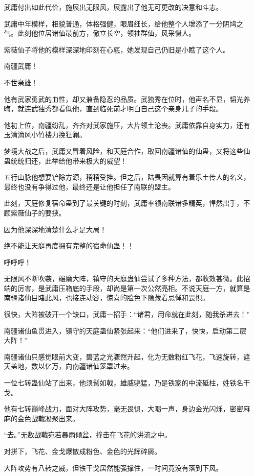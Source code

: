\begin{this_body}
武庸付出如此代价，施展出无限风，展露出了他无可更改的决意和斗志。

武庸中年模样，相貌普通，体格强健，眼眉细长，给他整个人增添了一分阴鸠之气。此刻他位居诸仙最前方，傲立长空，领袖群仙，风采慑人。

紫薇仙子将他的模样深深地印刻在心底，她发现自己仍旧是小瞧了这个人。

南疆武庸！

不世枭雄！

他有武家勇武的血性，却又兼备隐忍的品质。武独秀在位时，他声名不显，韬光养晦，就连武独秀都看低他，直到临死前才明白自己这个亲身儿子的手段。

他初上位，南疆纷乱，齐齐对武家施压，大片领土沦丧。武庸依靠自身实力，还有玉清滴风小竹楼力挽狂澜。

梦境大战之后，武庸又冒着风险，和天庭合作，取回南疆诸仙的仙蛊，又将这些仙蛊统统归还，此举给他带来极大的威望！

五行山脉他想要铲除方源，稍稍受挫。但之后，陆畏因就算有着乐土传人的名义，最终也没有争得过他，最终还是让他担任了南联的盟主。

此刻，天庭修复宿命蛊到了最关键的时刻，武庸率领南联诸多精英，悍然出手，不顾紫薇仙子的要挟。

因为他深深地清楚什么才是大局！

绝不能让天庭再度拥有完整的宿命仙蛊！！

呼呼呼！

无限风不断吹袭，碾磨大阵，镇守的天庭蛊仙尝试了多种方法，都收效甚微。此招端的厉害，是武庸压箱底的手段，却尚是第一次公然亮相。不说天庭一方，就算是南疆诸仙目睹此风，也接连动容，惊喜的脸色下隐藏着忌惮和畏惧。

很快，大阵被破开一个缺口，武庸一招手：“诸君，用命就在此刻，随我杀进去！”

南疆诸仙鱼贯进入，镇守的天庭蛊仙紧张起来：“他们进来了，快快，启动第二层大阵！”

南疆诸仙只感觉眼前大变，碧蓝之光骤然升起，化为无数粉红飞花，飞速旋转，遮天盖地，数以亿万，向南疆诸仙笼罩过来。

一位七转蛊仙站了出来，他须髯如戟，雄威骁猛，乃是铁家的中流砥柱，姓铁名干戈。

他有七转巅峰战力，面对大阵攻势，毫无畏惧，大喝一声，身边金光闪烁，密密麻麻的金色战戟凝聚出来。

“去。”无数战戟宛若暴雨倾盆，撞击在飞花的洪流之中。

对拼下，飞花、金戈爆散成粉色、金色的光辉碎屑。

大阵攻势有八转之威，但铁干戈居然能强撑住，一时间竟没有落到下风。


\end{this_body}
